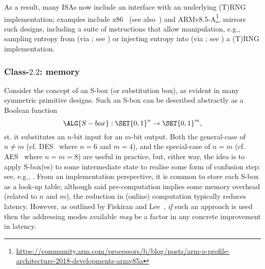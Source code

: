 As a result, many ISAs now include an interface with an underlying (T)RNG
implementation; examples include
x86~\cite[Section 7.3.17.1 and 7.3.17.2]{SCARV:X86:2:18} (see also~\cite{SCARV:JunKoc:99,SCARV:HamKocMar:12})
and
ARMv8.5-A\footnote{
\url{https://community.arm.com/processors/b/blog/posts/arm-a-profile-architecture-2018-developments-armv85a}
}.  \XCID mirrors such designs, including
a suite of instructions 
that allow 
manipulation, e.g.,
 sampling entropy from (via ; see )
or
injecting entropy into (via ; see )
a (T)RNG implementation.


\subsubsection{Class-$2.2$: memory}
\label{sec:bg:feature:2:2}

Consider the concept of an S-box (or substitution box), as evident in many 
symmetric primitive designs.  Such an S-box can be described abstractly as 
a Boolean function
\[
\ALG{S-box} : \SET{ 0, 1 }^{n} \rightarrow \SET{ 0, 1 }^{m} ,
\]
st. it substitutes an $n$-bit input for an $m$-bit output.  Both 
the general-case of $n \neq m$
(cf. DES~\cite{SCARV:FIPS:46_3} where $n = 6$ and $m = 4$),
and 
the special-case of $n =    m$
(cf. AES~\cite{SCARV:FIPS:197}  where $n = m = 8$)
are useful in practice, but, either way, the idea is to apply S-box(es) to
some intermediate state to realise some form of confusion step: see, e.g., 
\cite[Section 1.3]{SCARV:KnuRob:11}.
From an implementation perspective, it is common to store each S-box as a
look-up table; although said pre-computation implies some memory overhead
(related to $n$ and $m$), the reduction in (online) computation typically
reduces latency.
However, as outlined by Fiskiran and Lee~\cite{SCARV:FisLee:01}, {\em if}
such an approach is used then the addressing modes available {\em may} be
a factor in any concrete improvement in latency.

